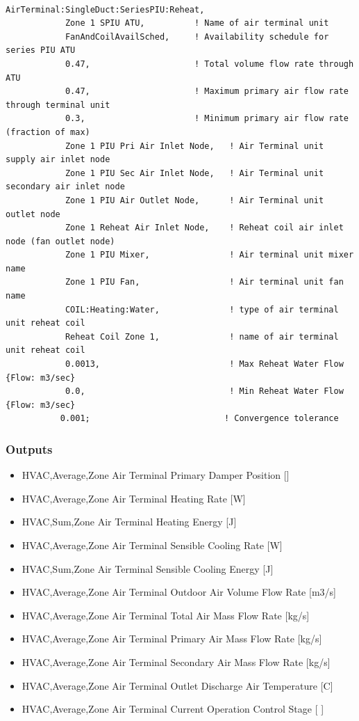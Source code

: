 \begin{lstlisting}

AirTerminal:SingleDuct:SeriesPIU:Reheat,
            Zone 1 SPIU ATU,          ! Name of air terminal unit
            FanAndCoilAvailSched,     ! Availability schedule for series PIU ATU
            0.47,                     ! Total volume flow rate through ATU
            0.47,                     ! Maximum primary air flow rate through terminal unit
            0.3,                      ! Minimum primary air flow rate (fraction of max)
            Zone 1 PIU Pri Air Inlet Node,   ! Air Terminal unit supply air inlet node
            Zone 1 PIU Sec Air Inlet Node,   ! Air Terminal unit secondary air inlet node
            Zone 1 PIU Air Outlet Node,      ! Air Terminal unit outlet node
            Zone 1 Reheat Air Inlet Node,    ! Reheat coil air inlet node (fan outlet node)
            Zone 1 PIU Mixer,                ! Air terminal unit mixer name
            Zone 1 PIU Fan,                  ! Air terminal unit fan name
            COIL:Heating:Water,              ! type of air terminal unit reheat coil
            Reheat Coil Zone 1,              ! name of air terminal unit reheat coil
            0.0013,                          ! Max Reheat Water Flow {Flow: m3/sec}
            0.0,                             ! Min Reheat Water Flow {Flow: m3/sec}
           0.001;                           ! Convergence tolerance
\end{lstlisting}

\subsubsection{Outputs}\label{outputs-7}

\begin{itemize}
\item
  HVAC,Average,Zone Air Terminal Primary Damper Position {[]}
\item
  HVAC,Average,Zone Air Terminal Heating Rate {[}W{]}
\item
  HVAC,Sum,Zone Air Terminal Heating Energy {[}J{]}
\item
  HVAC,Average,Zone Air Terminal Sensible Cooling Rate {[}W{]}
\item
  HVAC,Sum,Zone Air Terminal Sensible Cooling Energy {[}J{]}
\item
  HVAC,Average,Zone Air Terminal Outdoor Air Volume Flow Rate {[}m3/s{]}
\item
  HVAC,Average,Zone Air Terminal Total Air Mass Flow Rate {[}kg/s{]}
\item
  HVAC,Average,Zone Air Terminal Primary Air Mass Flow Rate {[}kg/s{]}
\item
  HVAC,Average,Zone Air Terminal Secondary Air Mass Flow Rate {[}kg/s{]}
\item
  HVAC,Average,Zone Air Terminal Outlet Discharge Air Temperature {[}C{]}
\item
  HVAC,Average,Zone Air Terminal Current Operation Control Stage {[} {]}
\end{itemize}

